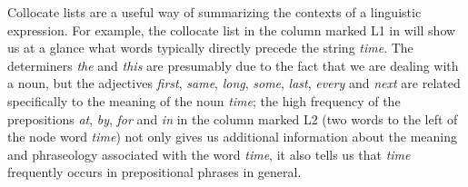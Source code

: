 Collocate  lists are a useful way of summarizing the contexts of a linguistic expression. For example, the collocate list in the column marked L1 in  will show us at a glance what words typically directly precede the string \textit{time}. The determiners \textit{the} and \textit{this} are presumably due to the fact that we are dealing with a noun,  but the adjectives  \textit{first}, \textit{same}, \textit{long}, \textit{some}, \textit{last}, \textit{every} and \textit{next} are related specifically to the meaning  of the noun \textit{time}; the high frequency  of the prepositions  \textit{at}, \textit{by}, \textit{for} and \textit{in} in the column marked L2 (two words to the left of the node word \textit{time}) not only gives us additional information about the meaning and phraseology associated  with the word \textit{time}, it also tells us that \textit{time} frequently occurs in prepositional  phrases in general.

